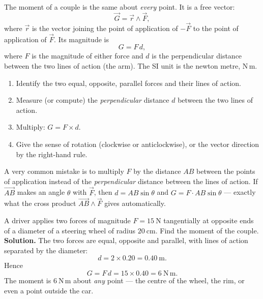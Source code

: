 \documentclass[11pt]{article}
\newcommand{\cle}[1]{{\popxbold\color{popdark}#1}}
\begin{document}
\begin{propriete}
The moment of a couple is the same about \emph{every} point. It is a \cle{free vector}:
\[
\vec{G} = \vec{r} \wedge \vec{F},
\]
where $\vec{r}$ is the vector joining the point of application of $-\vec{F}$ to the point of application of $\vec{F}$. Its magnitude is
\[
G = F\,d,
\]
where $F$ is the magnitude of either force and $d$ is the perpendicular distance between the two lines of action (the arm). The SI unit is the newton metre, $\mathrm{N\,m}$.
\end{propriete}

\begin{methode}
\begin{enumerate}
\item Identify the two equal, opposite, parallel forces and their lines of action.
\item Measure (or compute) the \emph{perpendicular} distance $d$ between the two lines of action.
\item Multiply: $G = F \times d$.
\item Give the sense of rotation (clockwise or anticlockwise), or the vector direction by the right-hand rule.
\end{enumerate}
\end{methode}

\begin{attention}
A very common mistake is to multiply $F$ by the distance $AB$ between the points of application instead of the \emph{perpendicular} distance between the lines of action. If $\vec{AB}$ makes an angle $\theta$ with $\vec{F}$, then $d = AB \sin\theta$ and $G = F \cdot AB \sin\theta$ — exactly what the cross product $\vec{AB} \wedge \vec{F}$ gives automatically.
\end{attention}

\begin{exoresolu}
A driver applies two forces of magnitude $F = 15\ \mathrm{N}$ tangentially at opposite ends of a diameter of a steering wheel of radius $20\ \mathrm{cm}$. Find the moment of the couple.
\tcblower
\textbf{Solution.} The two forces are equal, opposite and parallel, with lines of action separated by the diameter:
\[
d = 2 \times 0.20 = 0.40\ \mathrm{m}.
\]
Hence
\[
G = F\,d = 15 \times 0.40 = 6\ \mathrm{N\,m}.
\]
The moment is $6\ \mathrm{N\,m}$ about \emph{any} point — the centre of the wheel, the rim, or even a point outside the car.
\end{exoresolu}
\end{document}

